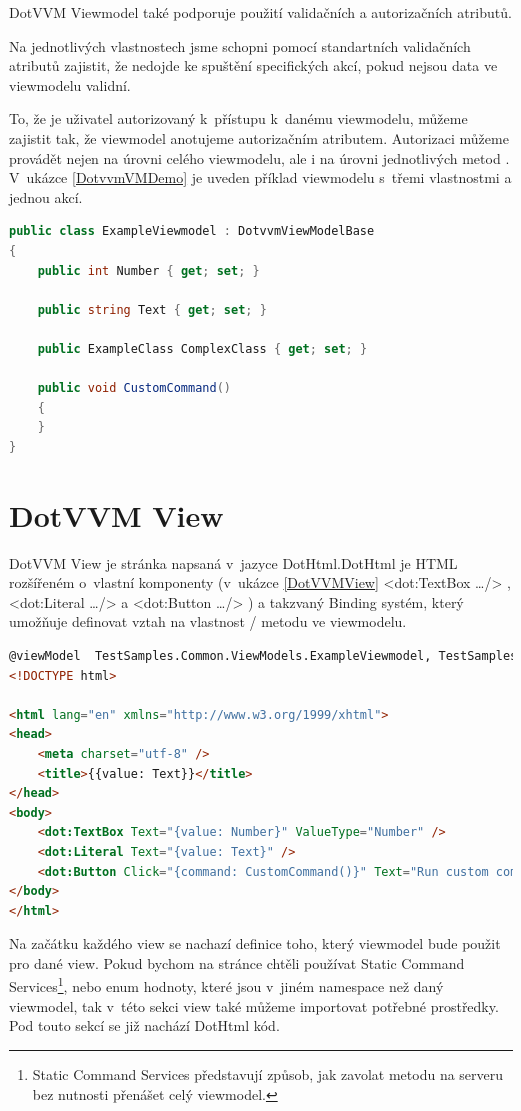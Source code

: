 DotVVM Viewmodel také podporuje použití validačních a autorizačních atributů.

Na jednotlivých vlastnostech jsme schopni pomocí standartních validačních atributů zajistit, že nedojde ke spuštění specifických akcí, pokud nejsou data ve viewmodelu validní\cite{DotVVM-Validation}. 

To, že je uživatel autorizovaný k~přístupu k~danému viewmodelu, můžeme zajistit tak, že viewmodel anotujeme autorizačním atributem. Autorizaci můžeme provádět nejen na úrovni celého viewmodelu, ale i na úrovni jednotlivých metod \cite{DotvvmAuth}. V~ukázce \ref{DotvvmVMDemo} je uveden příklad viewmodelu s~třemi vlastnostmi a jednou akcí.

\begin{lstlisting}[language=c#, caption=Ukázka DotVVM Viewmodelu,label=DotvvmVMDemo,captionpos=t]
public class ExampleViewmodel : DotvvmViewModelBase
{
    public int Number { get; set; }

    public string Text { get; set; }

    public ExampleClass ComplexClass { get; set; }

    public void CustomCommand() 
    {
    }
}
\end{lstlisting}


\section{DotVVM View}
DotVVM View je stránka napsaná v~jazyce DotHtml.DotHtml je HTML rozšířeném o~vlastní komponenty (v~ukázce \ref{DotVVMView} <dot:TextBox \ldots /> , <dot:Literal \ldots /> a <dot:Button \ldots /> ) a takzvaný Binding systém, který umožňuje definovat vztah na vlastnost / metodu ve viewmodelu.

\begin{lstlisting}[language=html, caption=Ukázka DotHtml,captionpos=t,label=DotVVMView]
@viewModel  TestSamples.Common.ViewModels.ExampleViewmodel, TestSamples.Common
<!DOCTYPE html>

<html lang="en" xmlns="http://www.w3.org/1999/xhtml">
<head>
    <meta charset="utf-8" />
    <title>{{value: Text}}</title>
</head>
<body>
    <dot:TextBox Text="{value: Number}" ValueType="Number" />
    <dot:Literal Text="{value: Text}" />
    <dot:Button Click="{command: CustomCommand()}" Text="Run custom command" />
</body>
</html>
\end{lstlisting}

    Na začátku každého view se nachazí definice toho, který viewmodel bude použit pro dané view. Pokud bychom na stránce chtěli používat Static Command Services\footnote{Static Command Services představují způsob, jak zavolat metodu na serveru bez nutnosti přenášet celý viewmodel.}, nebo enum hodnoty, které jsou v~jiném namespace než daný viewmodel, tak v~této sekci view také můžeme importovat potřebné prostředky. Pod touto sekcí se již nachází DotHtml kód.
    
